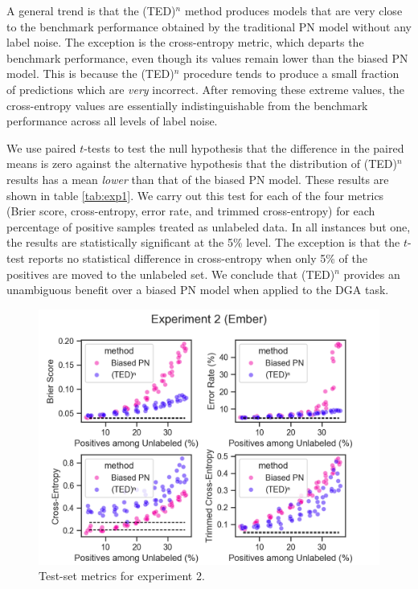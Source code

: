 \documentclass[conference]{IEEEtran}
\begin{document}
    A general trend is that the (TED)${}^n$ method produces models that are very close to the benchmark performance obtained by the traditional PN model without any label noise. The exception is the cross-entropy metric, which departs the benchmark performance, even though its values remain lower than the biased PN model. This is because the (TED)${}^n$ procedure tends to produce a small fraction of predictions which are \textit{very} incorrect. After removing these extreme values, the cross-entropy values are essentially indistinguishable from the benchmark performance across all levels of label noise.

    We use paired $t$-tests to test the null hypothesis that the difference in the paired means is zero against the alternative hypothesis that the distribution of (TED)${}^n$ results has a mean \textit{lower} than that of the biased PN model. These results are shown in table \ref{tab:exp1}. We carry out this test for each of the four metrics (Brier score, cross-entropy, error rate, and trimmed cross-entropy) for each percentage of positive samples treated as unlabeled data. In all instances but one, the results are statistically significant at the 5\% level. The exception is that the $t$-test reports no statistical difference in cross-entropy when only 5\% of the positives are moved to the unlabeled set. We conclude that (TED)${}^n$ provides an unambiguous benefit over a biased PN model when applied to the DGA task.

    \begin{figure}
        \centering 
        \includegraphics[scale=0.5]{experiment-2}
        \caption{Test-set metrics for experiment 2.} 
        \label{fig:exp2} 
    \end{figure} 
\end{document}
